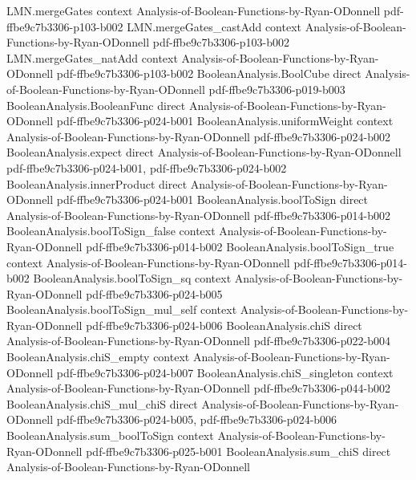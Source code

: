 \begin{lemma}
\proofstep
  {LMN.mergeGates}
  {context}
  {Analysis-of-Boolean-Functions-by-Ryan-ODonnell}
  {pdf-ffbe9c7b3306-p103-b002}
\proofstep
  {LMN.mergeGates_castAdd}
  {context}
  {Analysis-of-Boolean-Functions-by-Ryan-ODonnell}
  {pdf-ffbe9c7b3306-p103-b002}
\proofstep
  {LMN.mergeGates_natAdd}
  {context}
  {Analysis-of-Boolean-Functions-by-Ryan-ODonnell}
  {pdf-ffbe9c7b3306-p103-b002}
\proofstep
  {BooleanAnalysis.BoolCube}
  {direct}
  {Analysis-of-Boolean-Functions-by-Ryan-ODonnell}
  {pdf-ffbe9c7b3306-p019-b003}
\proofstep
  {BooleanAnalysis.BooleanFunc}
  {direct}
  {Analysis-of-Boolean-Functions-by-Ryan-ODonnell}
  {pdf-ffbe9c7b3306-p024-b001}
\proofstep
  {BooleanAnalysis.uniformWeight}
  {context}
  {Analysis-of-Boolean-Functions-by-Ryan-ODonnell}
  {pdf-ffbe9c7b3306-p024-b002}
\proofstep
  {BooleanAnalysis.expect}
  {direct}
  {Analysis-of-Boolean-Functions-by-Ryan-ODonnell}
  {pdf-ffbe9c7b3306-p024-b001,
    pdf-ffbe9c7b3306-p024-b002}
\proofstep
  {BooleanAnalysis.innerProduct}
  {direct}
  {Analysis-of-Boolean-Functions-by-Ryan-ODonnell}
  {pdf-ffbe9c7b3306-p024-b001}
\proofstep
  {BooleanAnalysis.boolToSign}
  {direct}
  {Analysis-of-Boolean-Functions-by-Ryan-ODonnell}
  {pdf-ffbe9c7b3306-p014-b002}
\proofstep
  {BooleanAnalysis.boolToSign_false}
  {context}
  {Analysis-of-Boolean-Functions-by-Ryan-ODonnell}
  {pdf-ffbe9c7b3306-p014-b002}
\proofstep
  {BooleanAnalysis.boolToSign_true}
  {context}
  {Analysis-of-Boolean-Functions-by-Ryan-ODonnell}
  {pdf-ffbe9c7b3306-p014-b002}
\proofstep
  {BooleanAnalysis.boolToSign_sq}
  {context}
  {Analysis-of-Boolean-Functions-by-Ryan-ODonnell}
  {pdf-ffbe9c7b3306-p024-b005}
\proofstep
  {BooleanAnalysis.boolToSign_mul_self}
  {context}
  {Analysis-of-Boolean-Functions-by-Ryan-ODonnell}
  {pdf-ffbe9c7b3306-p024-b006}
\proofstep
  {BooleanAnalysis.chiS}
  {direct}
  {Analysis-of-Boolean-Functions-by-Ryan-ODonnell}
  {pdf-ffbe9c7b3306-p022-b004}
\proofstep
  {BooleanAnalysis.chiS_empty}
  {context}
  {Analysis-of-Boolean-Functions-by-Ryan-ODonnell}
  {pdf-ffbe9c7b3306-p024-b007}
\proofstep
  {BooleanAnalysis.chiS_singleton}
  {context}
  {Analysis-of-Boolean-Functions-by-Ryan-ODonnell}
  {pdf-ffbe9c7b3306-p044-b002}
\proofstep
  {BooleanAnalysis.chiS_mul_chiS}
  {direct}
  {Analysis-of-Boolean-Functions-by-Ryan-ODonnell}
  {pdf-ffbe9c7b3306-p024-b005,
    pdf-ffbe9c7b3306-p024-b006}
\proofstep
  {BooleanAnalysis.sum_boolToSign}
  {context}
  {Analysis-of-Boolean-Functions-by-Ryan-ODonnell}
  {pdf-ffbe9c7b3306-p025-b001}
\proofstep
  {BooleanAnalysis.sum_chiS}
  {direct}
  {Analysis-of-Boolean-Functions-by-Ryan-ODonnell}

\end{lemma}
